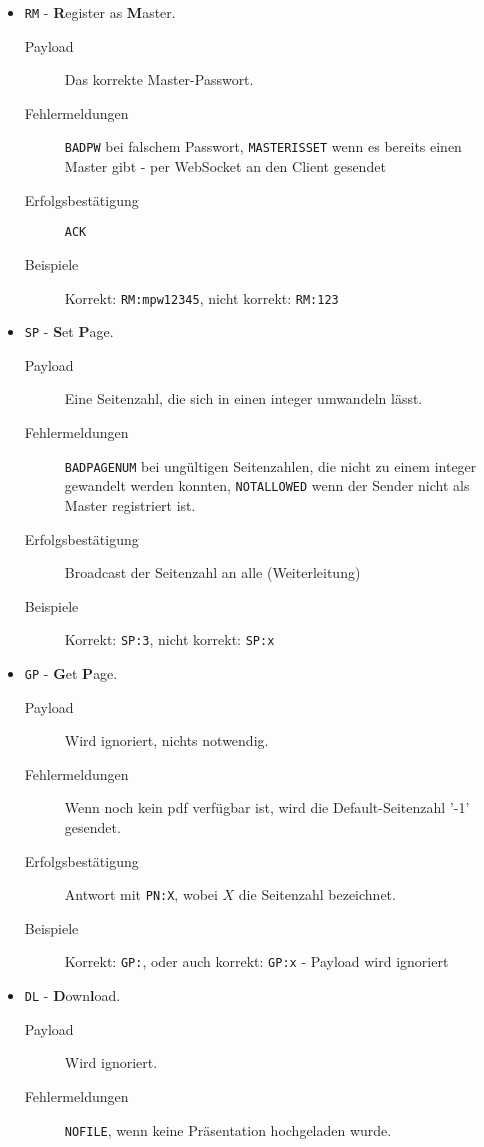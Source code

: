 \begin{itemize}
	\item \verb+RM+ - \textbf{R}egister as \textbf{M}aster.
		\begin{description}
			\item[Payload] Das korrekte Master-Passwort.
			\item[Fehlermeldungen] \verb+BADPW+ bei falschem Passwort, \verb+MASTERISSET+ wenn es bereits einen Master gibt - per WebSocket an den Client gesendet
			\item [Erfolgsbestätigung] \verb+ACK+
			\item [Beispiele] Korrekt: \verb+RM:mpw12345+, nicht korrekt: \verb+RM:123+
		\end{description}
	\item \verb+SP+ - \textbf{S}et \textbf{P}age.
		\begin{description}
			\item[Payload] Eine Seitenzahl, die sich in einen integer umwandeln lässt.
			\item[Fehlermeldungen] \verb+BADPAGENUM+ bei ungültigen Seitenzahlen, die nicht zu einem integer gewandelt werden konnten, \verb+NOTALLOWED+ wenn der Sender nicht als Master registriert ist.
			\item [Erfolgsbestätigung] Broadcast der Seitenzahl an alle (Weiterleitung)
			\item [Beispiele] Korrekt: \verb+SP:3+, nicht korrekt: \verb+SP:x+
		\end{description}
	\item \verb+GP+ - \textbf{G}et \textbf{P}age.
		\begin{description}
			\item[Payload] Wird ignoriert, nichts notwendig. 
			\item[Fehlermeldungen] Wenn noch kein pdf verfügbar ist, wird die Default-Seitenzahl '-1' gesendet.
			\item [Erfolgsbestätigung] Antwort mit \verb+PN:X+, wobei $X$ die Seitenzahl bezeichnet.
			\item [Beispiele] Korrekt: \verb+GP:+, oder auch korrekt: \verb+GP:x+ - Payload wird ignoriert
		\end{description}
	\item \verb+DL+ - \textbf{D}own\textbf{l}oad.
		\begin{description}
			\item[Payload] Wird ignoriert.
			\item[Fehlermeldungen] \verb+NOFILE+, wenn keine Präsentation hochgeladen wurde.

\end{description}
\end{itemize}
